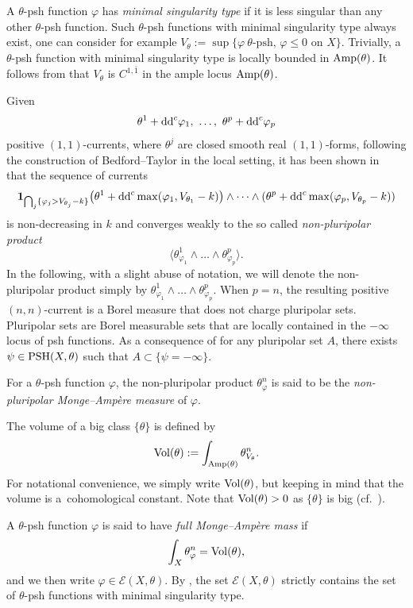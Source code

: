\documentclass[11pt]{article}
\numberwithin{equation}{section}
\numberwithin{equation}{section}
\theoremstyle{plain}
\newcommand \psh {{\rm PSH}}
\newcommand \Amp {{\rm Amp}}
\begin{document}
A $\theta$-psh function $\varphi$ has \emph{minimal singularity type} if it is less singular than any other $\theta$-psh function. Such $\theta$-psh functions with minimal singularity type always exist, one can consider for example $V_\theta:=\sup \{ \varphi \ \theta\text{-psh},\, \varphi\le 0\text{ on } X \}$. Trivially, a $\theta$-psh function with minimal singularity type is locally bounded in $\Amp(\theta)$. It follows from \cite[Theorem~1.1]{DNT23} that $V_{\theta}$ is $C^{1, \bar{1}}$ in the ample locus ${\rm Amp}(\theta)$.

Given
\[\theta^1+{\rm dd}^c\varphi_1, \ \dots, \ \theta^p+{\rm dd}^c \varphi_p\] positive $(1,1)$-currents, where $\theta^j$ are closed smooth real $(1,1)$-forms, following the construction of Bedford--Taylor \cite{BT87} in the local setting, it has been shown in~\cite{BEGZ10} that the sequence of currents
\[
{\bf 1}_{\bigcap_j\{\varphi_j>V_{\theta_j}-k\}}\big(\theta^1+{\rm dd}^c \max(\varphi_1, V_{\theta_1}-k)\big)\wedge\dots\wedge (\theta^p+{\rm dd}^c\max(\varphi_p, V_{\theta_p}-k))
\]
is non-decreasing in $k$ and converges weakly to the so called \emph{non-pluripolar product}
\[%
\big\langle \theta^1_{\varphi_1 } \wedge\dots\wedge\theta^p_{\varphi_p}\big\rangle .
\]
In the following, with a slight abuse of notation, we will denote the non-pluripolar product simply by $\theta^1_{\varphi_1 } \wedge\dots\wedge\theta^p_{\varphi_p}$.
When $p =n$, the resulting positive $(n,n)$-current is a Borel measure that does not charge pluripolar sets. Pluripolar sets are Borel measurable sets that are locally contained in the $-\infty$ locus of psh functions. As a consequence of \cite[Corollary 2.11]{BBGZ13} for any pluripolar set $A$, there exists $\psi\in \psh(X,\theta)$ such that $A\subset \{\psi=-\infty\}$.

For a $\theta$-psh function $\varphi$, the non-pluripolar product $\theta_\varphi^n$ is said to be the \emph{non-pluripolar Monge--Amp{\`e}re measure} of $\varphi$.

The volume of a big class $\{ \theta\}$ is defined by
\[
{\rm Vol}(\theta):= \int_{{\rm Amp}(\theta)} \theta_{V_\theta}^n.
\]
For notational convenience, we simply write ${\rm Vol}(\theta)$, but keeping in mind that the volume is a~cohomological constant. Note that ${\rm Vol}(\theta)>0$ as $\{\theta\}$ is big (cf.\ \cite{BEGZ10}).

A $\theta$-psh function $\varphi$ is said to have \emph{full Monge--Amp\`ere mass} if
\[
\int_X \theta_\varphi^n={\rm Vol}(\theta),
\]
and we then write $\varphi\in \mathcal{E}(X,\theta)$. By \cite[Theorem 1.16]{BEGZ10}, the set $\mathcal{E}(X,\theta)$ strictly contains the set of $\theta$-psh functions with minimal singularity type.
\end{document}
